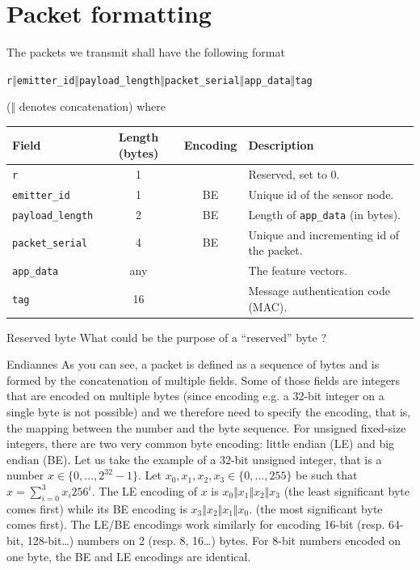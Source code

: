 
\section{Packet formatting}

The packets we transmit shall have the following format
\begin{center}
\texttt{r$\mathbin\Vert$emitter\_id$\mathbin\Vert$payload\_length$\mathbin\Vert$packet\_serial$\mathbin\Vert$app\_data$\mathbin\Vert$tag}
\end{center}
(\texttt{$\mathbin\Vert$} denotes concatenation)
where
\begin{center}
\begin{tabular}{lccl}
    Field & Length (bytes) & Encoding & Description \\ \hline
    \texttt{r} & 1 & & Reserved, set to 0.\\
    \texttt{emitter\_id} & 1 & BE & Unique id of the sensor node.\\
    \texttt{payload\_length} & 2 & BE & Length of \texttt{app\_data} (in bytes).\\
    \texttt{packet\_serial} & 4 & BE & Unique and incrementing id of the packet. \\
    \texttt{app\_data} & any  &  & The feature vectors. \\
    \texttt{tag} & 16 & & Message authentication code (MAC). \\
\end{tabular}
\end{center}

\begin{bclogo}[couleur = gray!20, arrondi = 0.2, logo=\bcquestion]{Reserved byte}
    What could be the purpose of a ``reserved'' byte ?
\end{bclogo}
\begin{bclogo}[couleur = gray!20, arrondi = 0.2, logo=\bcinfo]{Endiannes}
    As you can see, a packet is defined as a sequence of bytes and is formed by
    the concatenation of multiple fields.
    Some of those fields are integers that are encoded on multiple bytes (since
    encoding e.g. a 32-bit integer on a single byte is not possible) and we
    therefore need to specify the encoding, that is, the mapping between the
    number and the byte sequence.
    For unsigned fixed-size integers, there are two very common byte encoding:
    little endian (LE) and big endian (BE).
    Let us take the example of a 32-bit unsigned integer, that is a number $x \in
    \{0,\dots, 2^{32}-1\}$.
    Let $x_0,x_1,x_2,x_3\in\{0,...,255\}$ be such that $x = \sum_{i=0}^3 x_i 256^i$.
    The LE encoding of $x$ is \texttt{$x_0$$\mathbin\Vert$$x_1$$\mathbin\Vert$$x_2$$\mathbin\Vert$$x_3$} (the least
    significant byte comes first) while its BE encoding is
    \texttt{$x_3$$\mathbin\Vert$$x_2$$\mathbin\Vert$$x_1$$\mathbin\Vert$$x_0$}.  (the most significant byte comes
    first).
    The LE/BE encodings work similarly for encoding 16-bit (resp. 64-bit,
    128-bit\dots) numbers on 2 (resp. 8, 16\dots) bytes.
    For 8-bit numbers encoded on one byte, the BE and LE encodings are identical.
\end{bclogo}

